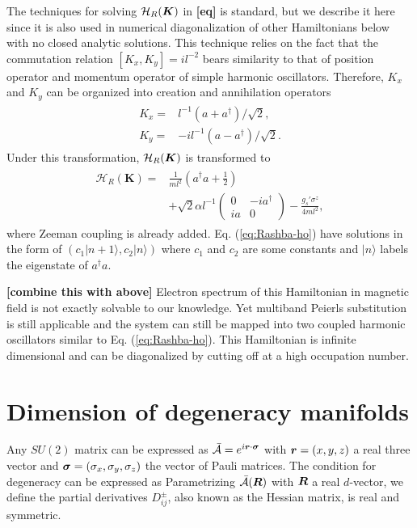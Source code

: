 \documentclass[aps, prb, showpacs, twocolumn, notitlepage, superscriptaddress]{revtex4-1}
\begin{document}
The techniques for solving $\mathcal{H}_R(\boldsymbol{K})$ in \textbf{[eq]} is standard, but we describe it here since it is also used in numerical diagonalization of other Hamiltonians below with no closed analytic solutions. This technique relies on the fact that the commutation relation $[K_x,K_y]=il^{-2}$ bears similarity to that of position operator and momentum operator of simple harmonic oscillators. Therefore, $K_x$ and $K_y$ can be organized into creation and annihilation operators
\begin{align}
\begin{split}
K_x=&l^{-1}(a+a^\dagger)/\sqrt{2},\\
K_y=&-il^{-1}(a-a^\dagger)/\sqrt{2}.
\end{split}
\end{align}
Under this transformation, $\mathcal{H}_R(\boldsymbol{K})$ is transformed to
\begin{align}
\begin{split}
\mathcal{H}_{R}(\boldsymbol{K})=&\frac{1}{ml^2}(a^{\dagger}a+\frac{1}{2})
\\&+\sqrt{2}\alpha l^{-1}\left(\begin{array}{cc}
0 & -ia^{\dagger}\\
ia & 0
\end{array}\right)
-\frac{g_s'\sigma^z}{4ml^2},
\end{split}\label{eq:Rashba-ho}
\end{align}
where Zeeman coupling is already added. Eq. (\ref{eq:Rashba-ho}) have solutions in the form of $(c_1|n+1\rangle,c_2|n\rangle)$ where $c_1$ and $c_2$ are some constants and $|n\rangle$ labels the eigenstate of $a^\dagger a$.

\textbf{[combine this with above]
}Electron spectrum of this Hamiltonian in magnetic field is not exactly solvable to our knowledge. Yet multiband Peierls substitution is still applicable and the system can still be mapped into two coupled harmonic oscillators similar to Eq. (\ref{eq:Rashba-ho}). This Hamiltonian is infinite dimensional and can be diagonalized by cutting off at a high occupation number. 


\section{Dimension of degeneracy manifolds}

Any $SU(2)$ matrix can be expressed as ${\cal \bar{A}}= e^{i\boldsymbol{r}\cdot \boldsymbol{\sigma}}$ with $\boldsymbol{r}=(x,y,z)$ a real three vector and $\boldsymbol{\sigma}=(\sigma_x,\sigma_y,\sigma_z)$ the vector of Pauli matrices. The condition for degeneracy can be expressed as
Parametrizing  ${\cal \bar{A}}(\boldsymbol{R})$ with $\boldsymbol{R}$ a real $d$-vector, we define the partial derivatives
$D^{\pm}_{ij}$, also known as the Hessian matrix, is real and symmetric. 
\end{document}

